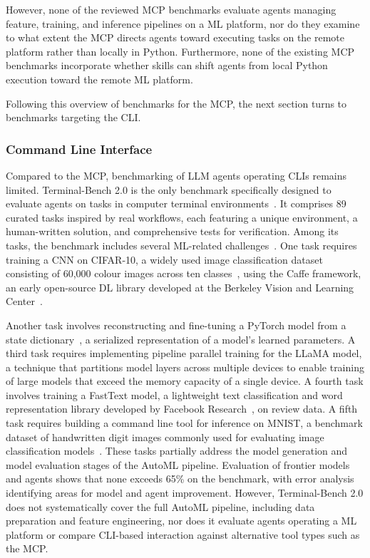 \documentclass[
english,                 %
bibtex,                  %
includeExtraAbstracts, %
]{kththesis}
\numberwithin{listing}{chapter}
\begin{document}
However, none of the reviewed \gls{MCP} benchmarks evaluate agents managing feature, training, and inference pipelines on a \gls{ML} platform, nor do they examine to what extent the \gls{MCP} directs agents toward executing tasks on the remote platform rather than locally in Python. Furthermore, none of the existing \gls{MCP} benchmarks incorporate whether skills can shift agents from local Python execution toward the remote \gls{ML} platform. 

Following this overview of benchmarks for the \gls{MCP}, the next section turns to benchmarks targeting the \gls{CLI}.

\subsubsection{Command Line Interface}

Compared to the \gls{MCP}, benchmarking of \gls{LLM} agents operating \glspl{CLI} remains limited. Terminal-Bench 2.0 is the only benchmark specifically designed to evaluate agents on tasks in computer terminal environments~\cite{merrill_terminal-bench_2026}. It comprises 89 curated tasks inspired by real workflows, each featuring a unique environment, a human-written solution, and comprehensive tests for verification. Among its tasks, the benchmark includes several \gls{ML}-related challenges~\cite{stanford_university_terminal-bench_2026}. One task requires training a \gls{CNN} on \gls{CIFAR}-10, a widely used image classification dataset consisting of 60,000 colour images across ten classes~\cite{krizhevsky_learning_2009}, using the Caffe framework, an early open-source \gls{DL} library developed at the Berkeley Vision and Learning Center~\cite{jia_caffe_2014}. 

Another task involves reconstructing and fine-tuning a PyTorch model from a state dictionary~\cite{paszke_pytorch_2019}, a serialized representation of a model's learned parameters. A third task requires implementing pipeline parallel training for the \gls{LLaMA} model, a technique that partitions model layers across multiple devices to enable training of large models that exceed the memory capacity of a single device. A fourth task involves training a FastText model, a lightweight text classification and word representation library developed by Facebook Research~\cite{joulin_fasttextzip_2016}, on review data. A fifth task requires building a command line tool for inference on \gls{MNIST}, a benchmark dataset of handwritten digit images commonly used for evaluating image classification models~\cite{lecun_mnist_2010}. These tasks partially address the model generation and model evaluation stages of the \gls{AutoML} pipeline. Evaluation of frontier models and agents shows that none exceeds 65\% on the benchmark, with error analysis identifying areas for model and agent improvement. However, Terminal-Bench 2.0 does not systematically cover the full \gls{AutoML} pipeline, including data preparation and feature engineering, nor does it evaluate agents operating a \gls{ML} platform or compare \gls{CLI}-based interaction against alternative tool types such as the \gls{MCP}. 
\end{document}
